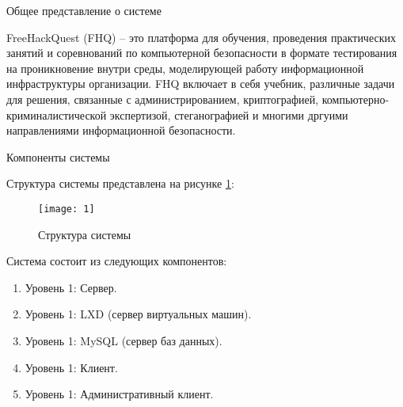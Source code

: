 \begin{center}
Общее представление о системе
\end{center}

\vspace{\baselineskip}

FreeHackQuest (FHQ) -- это платформа для обучения, проведения практических занятий и соревнований по компьютерной безопасности в формате тестирования на проникновение внутри среды, моделирующей работу информационной инфраструктуры организации. FHQ включает в себя учебник, различные задачи для решения, связанные с администрированием, криптографией, компьютерно-криминалистической экспертизой, стеганографией и многими дргуими направлениями информационной безопасности.\par

\begin{center}
Компоненты системы
\end{center}

\vspace{\baselineskip}

Структура системы представлена на рисунке \ref{img:1}:
\begin{figure}[h!]
    \centering
    \texttt{[image: 1]}
    \caption{Структура системы}
    \label{img:1}
\end{figure}
Система состоит из следующих компонентов:
\begin{enumerate}
\item Уровень 1: Сервер.
\item Уровень 1: LXD (сервер виртуальных машин).
\item Уровень 1: MySQL (сервер баз данных).
\item Уровень 1: Клиент.
\item Уровень 1: Административный клиент.
\end{enumerate}

